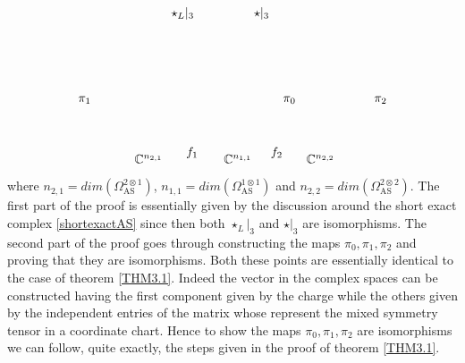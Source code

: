 \documentclass[a4paper,12pt]{article}
\begin{document}
\begin{equation}
\begin{tikzpicture}[x=0.75pt,y=0.75pt,yscale=-1,xscale=1]
\draw (209,249.4) node [anchor=north west][inner sep=0.75pt]    {$\star _{L} |_{3}$};
\draw (297,249.4) node [anchor=north west][inner sep=0.75pt]    {$\star |_{3}$};
\draw (353,406.4) node [anchor=north west][inner sep=0.75pt]    {$\mathbb{C}^{n_{2,2}}$};
\draw (265,406.4) node [anchor=north west][inner sep=0.75pt]    {$\mathbb{C}^{n_{1,1}}$};
\draw (170,406.4) node [anchor=north west][inner sep=0.75pt]    {$\mathbb{C}^{n_{2,1}}$};
\draw (328,344.4) node [anchor=north west][inner sep=0.75pt]    {$\pi _{0}$};
\draw (110,344.4) node [anchor=north west][inner sep=0.75pt]    {$\pi _{1}$};
\draw (425,344.4) node [anchor=north west][inner sep=0.75pt]    {$\pi _{2}$};
\draw (315,398.4) node [anchor=north west][inner sep=0.75pt]    {$f_{2}$};
\draw (225,398.4) node [anchor=north west][inner sep=0.75pt]    {$f_{1}$};
\end{tikzpicture}
\end{equation}
where $n_{2,1}=dim(\Omega_{\text{AS}}^{2 \otimes 1})$, $n_{1,1}=dim(\Omega_{\text{AS}}^{1 \otimes 1})$ and $n_{2,2}=dim(\Omega_{\text{AS}}^{2 \otimes 2})$. The first part of the proof is essentially given by the discussion around the short exact complex \eqref{shortexactAS} since then both $\star_L|_3$ and $\star|_3$ are isomorphisms. The second part of the proof goes through constructing the maps $\pi_0,\pi_1,\pi_2$ and proving that they are isomorphisms. Both these points are essentially identical to the case of theorem \ref{THM3.1}. Indeed the vector in the complex spaces can be constructed having the first component given by the charge while the others given by the independent entries of the matrix whose represent the mixed symmetry tensor in a coordinate chart. Hence to show the maps $\pi_0,\pi_1,\pi_2$ are isomorphisms we can follow, quite exactly, the steps given in the proof of theorem \ref{THM3.1}.
\end{document}
